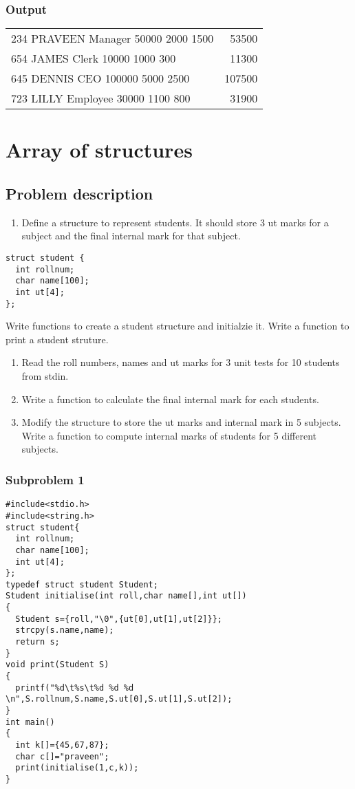 \documentclass[11pt]{article}
\begin{document}
\subsubsection*{Output}
\label{sec-1-6-2}
\begin{center}
\begin{tabular}{lr}
234 PRAVEEN Manager 50000 2000 1500 & 53500\\
654 JAMES Clerk 10000 1000 300 & 11300\\
645 DENNIS CEO 100000 5000 2500 & 107500\\
723 LILLY Employee 30000 1100 800 & 31900\\
\end{tabular}
\end{center}


\section{Array of structures}
\label{sec-2}
\subsection*{Problem description}
\label{sec-2-1}

\begin{enumerate}
\item Define a structure to represent students. It should store 3 ut marks for a subject and
the final internal mark for that subject.
\end{enumerate}
\begin{verbatim}
struct student {
  int rollnum;
  char name[100];
  int ut[4];
};
\end{verbatim}

Write functions to create a student structure and initialzie it. Write a function to print
a student struture.
\begin{enumerate}
\item Read the roll numbers, names and ut marks for 3 unit tests for 10 students from stdin.
\item Write a function to calculate the final internal mark for each students.
\item Modify the structure to store the ut marks and internal mark in 5 subjects. Write a
function to compute internal marks of students for 5 different subjects.
\end{enumerate}
\subsubsection*{Subproblem 1}
\label{sec-2-1-1}
\begin{verbatim}
#include<stdio.h>
#include<string.h>
struct student{
  int rollnum;
  char name[100];
  int ut[4];
};
typedef struct student Student;
Student initialise(int roll,char name[],int ut[])
{
  Student s={roll,"\0",{ut[0],ut[1],ut[2]}};
  strcpy(s.name,name);
  return s;
}
void print(Student S)
{
  printf("%d\t%s\t%d %d %d \n",S.rollnum,S.name,S.ut[0],S.ut[1],S.ut[2]);
}
int main()
{
  int k[]={45,67,87};
  char c[]="praveen";
  print(initialise(1,c,k));
}
\end{verbatim}
\end{document}
